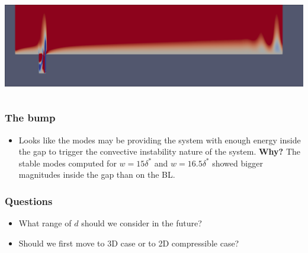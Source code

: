 \documentclass[
  aspectratio=169, %
  t, %
  onlytextwidth, %
  10pt, %
]{beamer}
\begin{document}
\begin{frame}
\begin{columns}[T]
\begin{column}{0.48\linewidth}
{      }
      {
	\centering
	\includegraphics[width=\linewidth]{Images/6.png}
      }
    \end{column}
  \end{columns}
\end{frame}
\begin{frame}
  \frametitle{The bump}
  \begin{itemize}
    \item Looks like the modes may be providing the system with enough energy inside the gap to trigger the convective instability nature of the system. \textbf{Why?} The stable modes computed for $w=15\delta^*$ and $w=16.5\delta^*$ showed bigger magnitudes inside the gap than on the BL.
  \end{itemize}
\end{frame}
\begin{frame}
  \frametitle{Questions}
  \begin{itemize}
    \item What range of $d$ should we consider in the future?
    \item Should we first move to 3D case or to 2D compressible case?
  \end{itemize}
\end{frame}
\end{document}
